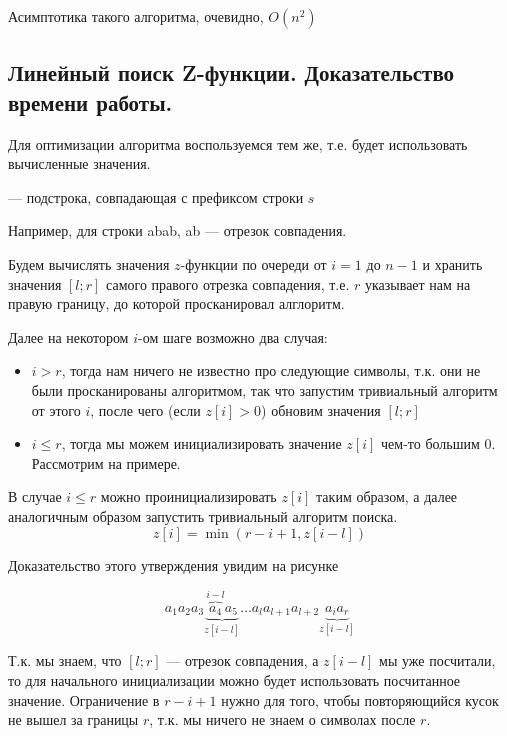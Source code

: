 \begin{remark}
	Асимптотика такого алгоритма, очевидно, $O(n^2)$
\end{remark}

\subsection{Линейный поиск Z-функции. Доказательство времени работы.}

Для оптимизации алгоритма воспользуемся тем же, т.е. будет использовать вычисленные значения.

\begin{definition}
	 --- подстрока, совпадающая с префиксом строки $s$
\end{definition}
Например, для строки abab, ab --- отрезок совпадения.

Будем вычислять значения $z$-функции по очереди от $i = 1$ до $n - 1$ и хранить значения $[l;r]$ самого правого
отрезка совпадения, т.е. $r$ указывает нам на правую границу, до которой просканировал алглоритм.

Далее на некотором $i$-ом шаге возможно два случая:
\begin{itemize}
	\item $i>r$, тогда нам ничего не известно про следующие символы, т.к. они не были просканированы
		алгоритмом, так что запустим тривиальный алгоритм от этого $i$, после чего (если $z[i] > 0$)
		обновим значения $[l;r]$ 
	\item $i \leq r$, тогда мы можем инициализировать значение $z[i]$ чем-то большим $0$. Рассмотрим на
		примере.
\end{itemize}

\begin{remark}
	В случае $i \leq r$ можно проинициализировать $z[i]$ таким образом, а далее аналогичным образом запустить
	тривиальный алгоритм поиска.
	\[
		z[i] = \min \left( r - i + 1, z[i-l] \right) 
	\] 
\end{remark}

Доказательство этого утверждения увидим на рисунке

\[
	a_1 a_2 a_3 \underbrace{\overbrace{a_4}^{i-l} a_5}_{z[i-l]} \ldots a_{l} a_{l+1} a_{l + 2} \underbrace{a_{i} a_{r}}_{z[i-l]} 
\] 

Т.к. мы знаем, что $[l;r]$ --- отрезок совпадения, а $z[i-l]$ мы уже посчитали, то для начального инициализации
можно будет использовать посчитанное значение. Ограничение в $r - i + 1$ нужно для того, чтобы повторяющийся
кусок не вышел за границы $r$, т.к. мы ничего не знаем о символах после $r$.

